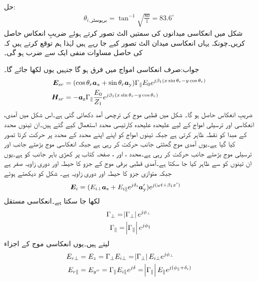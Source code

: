 حل:
\begin{align}
\theta_{i,\text{بریوسٹر}} =\tan^{-1} \sqrt{\frac{80}{1}}=83.6^{\circ}
\end{align} 
شکل  میں انعکاسی میدانوں کی سمتیں الٹ تصور کرتے ہوئے ضریبِ انعکاس  حاصل کریں۔چونکہ یہاں انعکاسی میدان الٹ تصور کیے جا رہے ہیں لہٰذا ہم توقع کرتے ہیں کہ  کی حاصل مساوات منفی ایک سے ضرب ہو گی۔

جواب:صرف انعکاسی امواج میں فرق ہو گا جنہیں یوں لکھا جائے گا۔
\begin{align*}
{\ensuremath{{\boldsymbol{E}}}}_{sr}&= (\cos \theta_r {\boldsymbol{a}}_{\textup{x}}+\sin \theta_r {\boldsymbol{a}}_{\textup{y}})\Gamma_{\parallel} E_0 e^{ j \beta_1 (x \sin \theta_r-y\cos \theta_r)}\\
{{\boldsymbol{H}}}_{sr}&=-{\boldsymbol{a}}_{\textup{z}}\Gamma_{\parallel} \frac{ E_0}{Z_1} e^{j \beta_1 (x \sin \theta_r-y\cos \theta_r)}
\end{align*}
ضریبِ انعکاس  حاصل ہو گا۔
شکل  میں قطبی موج کی ترچھی آمد دکھائی گئی ہے۔اس شکل میں آمدی، انعکاسی اور ترسیلی امواج کے لیے علیحدہ علیحدہ کارتیسی محدد استعمال کیے گئے ہیں۔ان تینوں محدد کے مبدا کو نقطہ  ظاہر کرتی ہے جبکہ تینوں امواج کو اپنے اپنے محدد کے  محدد پر حرکت کرتا تصور کیا گیا ہے۔یوں آمدی موج گھٹتی  جانب حرکت کر رہی ہے جبکہ انعکاسی موج  بڑھتے  جانب اور ترسیلی موج بڑھتے  جانب حرکت کر رہی ہے۔محدد ،  اور ،  صفحہ کتاب پر کھڑی  باہر جانب کو ہے۔یوں ان تینوں کو  سے ظاہر کیا جا سکتا ہے۔آمدی قطبی برقی موج کے   جزو کا حیطہ  اور دوری زاویہ صفر ہے جبکہ متوازی جزو کا حیطہ  اور دوری زاویہ   ہے۔ شکل کو دیکھتے ہوئے 
\begin{align}\label{مساوات_ترچھی_بیضوی__قطبی}
{\ensuremath{{\boldsymbol{E}}}}_i&=(E_{i\perp} {\boldsymbol{a}}_{\textup{z}}+E_{i\parallel} e^{j\delta_i}{\boldsymbol{a}}_{\textup{y}}')e^{j(\omega t+\beta_1 x')}
\end{align}
لکھا جا سکتا ہے۔انعکاسی مستقل
\begin{align}
\Gamma_{\perp}=\abs{\Gamma_{\perp}} e^{j\phi_{\perp}}\\
\Gamma_{\parallel}=\abs{\Gamma_{\parallel}} e^{j\phi_{\parallel}}
\end{align}
لیتے ہیں۔یوں انعکاسی موج کے  اجزاء 
\begin{align}
E_{r\perp}&=E_z=\Gamma_{\perp} E_{i\perp}=\abs{\Gamma_{\perp}}E_{i\perp} e^{j\phi_{\perp}}\\
E_{r\parallel}&=E_{y''}=\Gamma_{\parallel} E_{i\parallel}e^{j\delta}=\abs{\Gamma_{\parallel}} E_{\parallel} e^{j(\phi_{\parallel}+\delta_i)}
\end{align}
